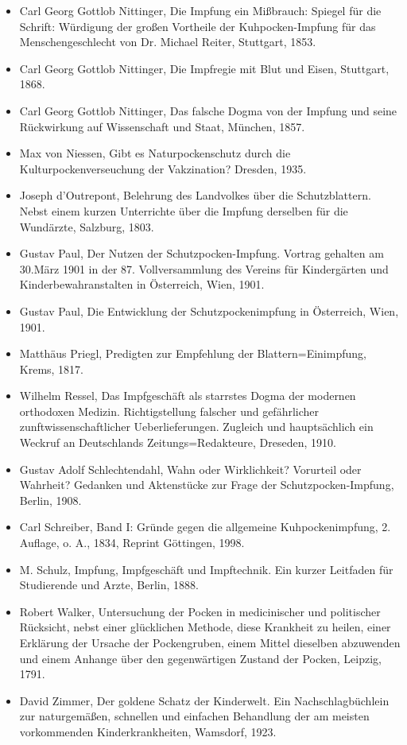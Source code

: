 \documentclass[
    a4paper,
    12pt,
    hyphens,
    chapterprefix=true,
    headheight=33pt,
    footheight=29pt,
    headings=optiontohead,
]{scrartcl}
\begin{document}
{\begin{itemize}
\item{Carl Georg Gottlob Nittinger, Die Impfung ein Mißbrauch: Spiegel für die Schrift: Würdigung der großen Vortheile der Kuhpocken-Impfung für das Menschengeschlecht von Dr. Michael Reiter, Stuttgart, 1853.}
\item{Carl Georg Gottlob Nittinger, Die Impfregie mit Blut und Eisen, Stuttgart, 1868.}
\item{Carl Georg Gottlob Nittinger, Das falsche Dogma von der Impfung und seine Rückwirkung auf Wissenschaft und Staat, München, 1857.}
\item{Max von Niessen, Gibt es Naturpockenschutz durch die Kulturpockenverseuchung der Vakzination? Dresden, 1935.}
\item{Joseph d'Outrepont, Belehrung des Landvolkes über die Schutzblattern. Nebst einem kurzen Unterrichte über die Impfung derselben für die Wundärzte, Salzburg, 1803.}
\item{Gustav Paul, Der Nutzen der Schutzpocken-Impfung. Vortrag gehalten am 30.März 1901 in der 87. Vollversammlung des Vereins für Kindergärten und Kinderbewahranstalten in Österreich, Wien, 1901.}
\item{Gustav Paul, Die Entwicklung der Schutzpockenimpfung in Österreich, Wien, 1901.}
\item{Matthäus Priegl, Predigten zur Empfehlung der Blattern=Einimpfung, Krems, 1817.}
\item{Wilhelm Ressel, Das Impfgeschäft als starrstes Dogma der modernen orthodoxen Medizin. Richtigstellung falscher und gefährlicher zunftwissenschaftlicher Ueberlieferungen. Zugleich und hauptsächlich ein Weckruf an Deutschlands Zeitungs=Redakteure, Dreseden, 1910.}
\item{Gustav Adolf Schlechtendahl, Wahn oder Wirklichkeit? Vorurteil oder Wahrheit? Gedanken und Aktenstücke zur Frage der Schutzpocken-Impfung, Berlin, 1908.}
\item{Carl Schreiber, Band I: Gründe gegen die allgemeine Kuhpockenimpfung, 2. Auflage, o. A., 1834, Reprint Göttingen, 1998.}
\item{M. Schulz, Impfung, Impfgeschäft und Impftechnik. Ein kurzer Leitfaden für Studierende und Arzte, Berlin, 1888.}
\item{Robert Walker, Untersuchung der Pocken in medicinischer und politischer Rücksicht, nebst einer glücklichen Methode, diese Krankheit zu heilen, einer Erklärung der Ursache der Pockengruben, einem Mittel dieselben abzuwenden und einem Anhange über den gegenwärtigen Zustand der Pocken, Leipzig, 1791.}
\item{David Zimmer, Der goldene Schatz der Kinderwelt. Ein Nachschlagbüchlein zur naturgemäßen, schnellen und einfachen Behandlung der am meisten vorkommenden Kinderkrankheiten, Wamsdorf, 1923.}
\end{itemize}

}
\end{document}
